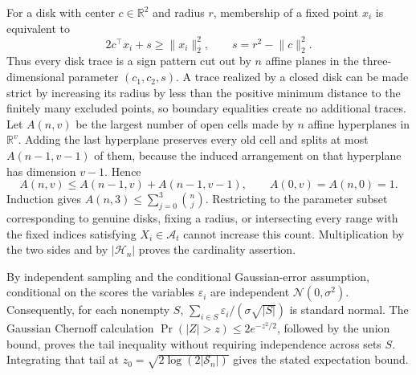 For a disk with center \(c\in\mathbb R^2\) and radius \(r\), membership of a fixed point \(x_i\) is equivalent to
\[
 2c^\top x_i+s\ge\lVert x_i\rVert_2^2,
 \qquad s=r^2-\lVert c\rVert_2^2.
\]
Thus every disk trace is a sign pattern cut out by \(n\) affine planes in the three-dimensional parameter \((c_1,c_2,s)\). A trace realized by a closed disk can be made strict by increasing its radius by less than the positive minimum distance to the finitely many excluded points, so boundary equalities create no additional traces. Let \(A(n,v)\) be the largest number of open cells made by \(n\) affine hyperplanes in \(\mathbb R^v\). Adding the last hyperplane preserves every old cell and splits at most \(A(n-1,v-1)\) of them, because the induced arrangement on that hyperplane has dimension \(v-1\). Hence
\[
 A(n,v)\le A(n-1,v)+A(n-1,v-1),
 \qquad A(0,v)=A(n,0)=1.
\]
Induction gives \(A(n,3)\le\sum_{j=0}^3\binom nj\). Restricting to the parameter subset corresponding to genuine disks, fixing a radius, or intersecting every range with the fixed indices satisfying \(X_i\in\mathcal A_t\) cannot increase this count. Multiplication by the two sides and by \(|\mathcal H_n|\) proves the cardinality assertion.

By independent sampling and the conditional Gaussian-error assumption, conditional on the scores the variables \(\varepsilon_i\) are independent \(\mathcal N(0,\sigma^2)\). Consequently, for each nonempty \(S\), \(\sum_{i\in S}\varepsilon_i/(\sigma\sqrt{|S|})\) is standard normal. The Gaussian Chernoff calculation \(\Pr(|Z|>z)\le2e^{-z^2/2}\), followed by the union bound, proves the tail inequality without requiring independence across sets \(S\). Integrating that tail at \(z_0=\sqrt{2\log(2|\mathscr S_n|)}\) gives the stated expectation bound.
